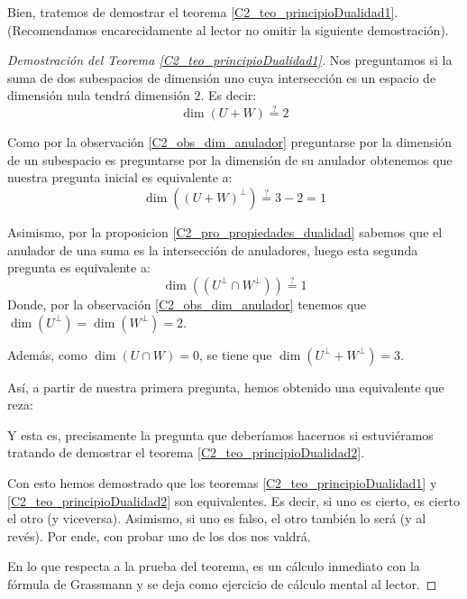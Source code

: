 Bien, tratemos de demostrar el teorema \ref{C2_teo_principioDualidad1}. (Recomendamos encarecidamente al lector no omitir la siguiente demostración).
\begin{proof}[Demostración del Teorema \ref{C2_teo_principioDualidad1}]
	Nos preguntamos si la suma de dos subespacios de dimensión uno cuya intersección es un espacio de dimensión nula tendrá dimensión $2$. Es decir:
	\begin{equation*}
		\dim(U+W)\stackrel{\mathrm{?}}{=}2
	\end{equation*}
	
	Como por la observación \ref{C2_obs_dim_anulador} preguntarse por la dimensión de un subespacio es preguntarse por la dimensión de su anulador obtenemos que nuestra pregunta inicial es equivalente a:
	\begin{equation*}
		\dim((U+W)^\perp)\stackrel{\mathrm{?}}{=}3-2=1
	\end{equation*}
	
	Asimismo, por la proposicion \ref{C2_pro_propiedades_dualidad} sabemos que el anulador de una suma es la intersección de anuladores, luego esta segunda pregunta es equivalente a:
	\begin{equation*}
		\dim((U^\perp\cap W^\perp))\stackrel{\mathrm{?}}{=}1
	\end{equation*}
	Donde, por la observación \ref{C2_obs_dim_anulador} tenemos que $\dim(U^\perp)=\dim(W^\perp)=2$.
	
	Además, como $\dim(U\cap W)=0$, se tiene que $\dim(U^\perp+W^\perp)=3$.
	
	Así, a partir de nuestra primera pregunta, hemos obtenido una equivalente que reza:
	
	
	Y esta es, precisamente la pregunta que deberíamos hacernos si estuviéramos tratando de demostrar el teorema \ref{C2_teo_principioDualidad2}.
	
	Con esto hemos demostrado que los teoremas \ref{C2_teo_principioDualidad1} y \ref{C2_teo_principioDualidad2} son equivalentes. Es decir, si uno es cierto, es cierto el otro (y viceversa). Asimismo, si uno es falso, el otro también lo será (y al revés). Por ende, con probar uno de los dos nos valdrá.
	
	En lo que respecta a la prueba del teorema, es un cálculo inmediato con la fórmula de Grassmann y se deja como ejercicio de cálculo mental al lector.
\end{proof}

